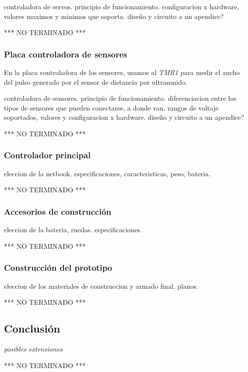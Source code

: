 controladora de servos.
principio de funcionamiento.
configuracion x hardware, valores maximos y minimos que soporta.
diseño y circuito a un apendice?




*** NO TERMINADO ***





\subsubsection{Placa controladora de sensores}
\label{HAPsensores}

En la placa controladora de los sensores, usamos al \emph{TMR1} para medir el ancho del pulso generado por el sensor de distancia
por ultrasonido.


controladora de sensores.
principio de funcionamiento.
diferenciacion entre los tipos de sensores que pueden conectarse, a donde van.
rangos de voltaje soportados, valores y configuracion x hardware.
diseño y circuito a un apendice?




*** NO TERMINADO ***





\subsubsection{Controlador principal}
\label{HAPprincipal}

eleccion de la netbook.
especificaciones, caracteristicas, peso, bateria.





*** NO TERMINADO ***





\subsubsection{Accesorios de construcci\'on}
\label{HAaccesorios}

eleccion de la bateria, ruedas.
especificaciones.




*** NO TERMINADO ***





\subsubsection{Construcci\'on del prototipo}
\label{HACprototipo}

eleccion de los materiales de construccion y armado final.
planos.





*** NO TERMINADO ***




\subsection{Conclusi\'on}
\label{Hconclusion}

\emph{posibles extensiones}



*** NO TERMINADO ***





